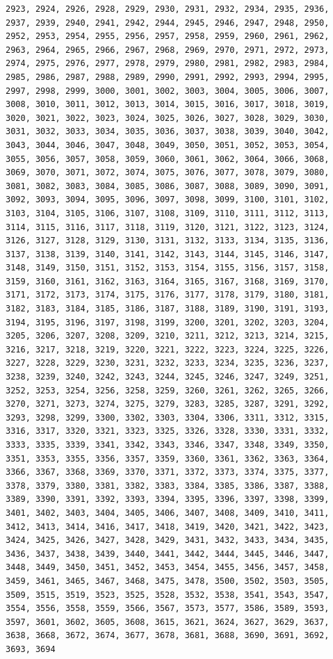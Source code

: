 \documentclass[a4paper, nobind]{templates/ociamthesis}
\begin{document}
\begin{verbatim}
2923, 2924, 2926, 2928, 2929, 2930, 2931, 2932, 2934, 2935, 2936, 2937, 2939, 2940, 2941, 2942, 2944, 2945, 2946, 2947, 2948, 2950, 2952, 2953, 2954, 2955, 2956, 2957, 2958, 2959, 2960, 2961, 2962, 2963, 2964, 2965, 2966, 2967, 2968, 2969, 2970, 2971, 2972, 2973, 2974, 2975, 2976, 2977, 2978, 2979, 2980, 2981, 2982, 2983, 2984, 2985, 2986, 2987, 2988, 2989, 2990, 2991, 2992, 2993, 2994, 2995, 2997, 2998, 2999, 3000, 3001, 3002, 3003, 3004, 3005, 3006, 3007, 3008, 3010, 3011, 3012, 3013, 3014, 3015, 3016, 3017, 3018, 3019, 3020, 3021, 3022, 3023, 3024, 3025, 3026, 3027, 3028, 3029, 3030, 3031, 3032, 3033, 3034, 3035, 3036, 3037, 3038, 3039, 3040, 3042, 3043, 3044, 3046, 3047, 3048, 3049, 3050, 3051, 3052, 3053, 3054, 3055, 3056, 3057, 3058, 3059, 3060, 3061, 3062, 3064, 3066, 3068, 3069, 3070, 3071, 3072, 3074, 3075, 3076, 3077, 3078, 3079, 3080, 3081, 3082, 3083, 3084, 3085, 3086, 3087, 3088, 3089, 3090, 3091, 3092, 3093, 3094, 3095, 3096, 3097, 3098, 3099, 3100, 3101, 3102, 3103, 3104, 3105, 3106, 3107, 3108, 3109, 3110, 3111, 3112, 3113, 3114, 3115, 3116, 3117, 3118, 3119, 3120, 3121, 3122, 3123, 3124, 3126, 3127, 3128, 3129, 3130, 3131, 3132, 3133, 3134, 3135, 3136, 3137, 3138, 3139, 3140, 3141, 3142, 3143, 3144, 3145, 3146, 3147, 3148, 3149, 3150, 3151, 3152, 3153, 3154, 3155, 3156, 3157, 3158, 3159, 3160, 3161, 3162, 3163, 3164, 3165, 3167, 3168, 3169, 3170, 3171, 3172, 3173, 3174, 3175, 3176, 3177, 3178, 3179, 3180, 3181, 3182, 3183, 3184, 3185, 3186, 3187, 3188, 3189, 3190, 3191, 3193, 3194, 3195, 3196, 3197, 3198, 3199, 3200, 3201, 3202, 3203, 3204, 3205, 3206, 3207, 3208, 3209, 3210, 3211, 3212, 3213, 3214, 3215, 3216, 3217, 3218, 3219, 3220, 3221, 3222, 3223, 3224, 3225, 3226, 3227, 3228, 3229, 3230, 3231, 3232, 3233, 3234, 3235, 3236, 3237, 3238, 3239, 3240, 3242, 3243, 3244, 3245, 3246, 3247, 3249, 3251, 3252, 3253, 3254, 3256, 3258, 3259, 3260, 3261, 3262, 3265, 3266, 3270, 3271, 3273, 3274, 3275, 3279, 3283, 3285, 3287, 3291, 3292, 3293, 3298, 3299, 3300, 3302, 3303, 3304, 3306, 3311, 3312, 3315, 3316, 3317, 3320, 3321, 3323, 3325, 3326, 3328, 3330, 3331, 3332, 3333, 3335, 3339, 3341, 3342, 3343, 3346, 3347, 3348, 3349, 3350, 3351, 3353, 3355, 3356, 3357, 3359, 3360, 3361, 3362, 3363, 3364, 3366, 3367, 3368, 3369, 3370, 3371, 3372, 3373, 3374, 3375, 3377, 3378, 3379, 3380, 3381, 3382, 3383, 3384, 3385, 3386, 3387, 3388, 3389, 3390, 3391, 3392, 3393, 3394, 3395, 3396, 3397, 3398, 3399, 3401, 3402, 3403, 3404, 3405, 3406, 3407, 3408, 3409, 3410, 3411, 3412, 3413, 3414, 3416, 3417, 3418, 3419, 3420, 3421, 3422, 3423, 3424, 3425, 3426, 3427, 3428, 3429, 3431, 3432, 3433, 3434, 3435, 3436, 3437, 3438, 3439, 3440, 3441, 3442, 3444, 3445, 3446, 3447, 3448, 3449, 3450, 3451, 3452, 3453, 3454, 3455, 3456, 3457, 3458, 3459, 3461, 3465, 3467, 3468, 3475, 3478, 3500, 3502, 3503, 3505, 3509, 3515, 3519, 3523, 3525, 3528, 3532, 3538, 3541, 3543, 3547, 3554, 3556, 3558, 3559, 3566, 3567, 3573, 3577, 3586, 3589, 3593, 3597, 3601, 3602, 3605, 3608, 3615, 3621, 3624, 3627, 3629, 3637, 3638, 3668, 3672, 3674, 3677, 3678, 3681, 3688, 3690, 3691, 3692, 3693, 3694
\end{verbatim}
\end{document}
